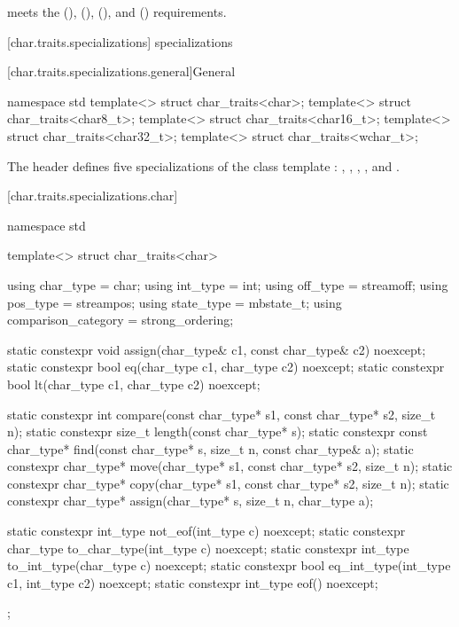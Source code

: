 \begin{itemdescr}
\pnum
\expects
{} meets the
 (),
 (),
 (), and
 () requirements.
\end{itemdescr}

[char.traits.specializations]{ specializations}

[char.traits.specializations.general]{General}

%
\begin{codeblock}
namespace std {
  template<> struct char_traits<char>;
  template<> struct char_traits<char8_t>;
  template<> struct char_traits<char16_t>;
  template<> struct char_traits<char32_t>;
  template<> struct char_traits<wchar_t>;
}
\end{codeblock}

\pnum
The header 
defines five specializations of the class template
:
,
,
,
,
and
.


[char.traits.specializations.char]{}

%
\begin{codeblock}
namespace std {
  template<> struct char_traits<char> {
    using char_type  = char;
    using int_type   = int;
    using off_type   = streamoff;
    using pos_type   = streampos;
    using state_type = mbstate_t;
    using comparison_category = strong_ordering;

    static constexpr void assign(char_type& c1, const char_type& c2) noexcept;
    static constexpr bool eq(char_type c1, char_type c2) noexcept;
    static constexpr bool lt(char_type c1, char_type c2) noexcept;

    static constexpr int compare(const char_type* s1, const char_type* s2, size_t n);
    static constexpr size_t length(const char_type* s);
    static constexpr const char_type* find(const char_type* s, size_t n,
                                           const char_type& a);
    static constexpr char_type* move(char_type* s1, const char_type* s2, size_t n);
    static constexpr char_type* copy(char_type* s1, const char_type* s2, size_t n);
    static constexpr char_type* assign(char_type* s, size_t n, char_type a);

    static constexpr int_type not_eof(int_type c) noexcept;
    static constexpr char_type to_char_type(int_type c) noexcept;
    static constexpr int_type to_int_type(char_type c) noexcept;
    static constexpr bool eq_int_type(int_type c1, int_type c2) noexcept;
    static constexpr int_type eof() noexcept;
  };
}
\end{codeblock}

